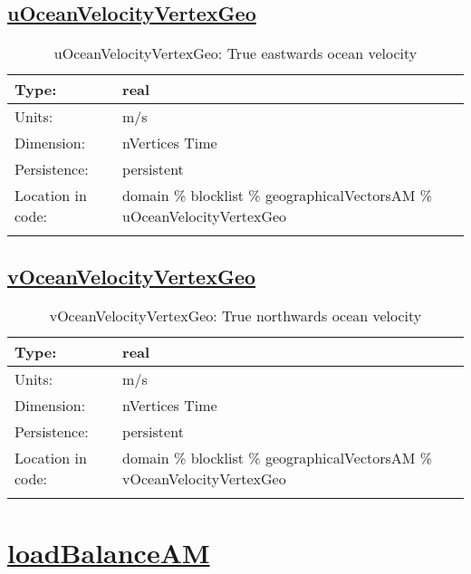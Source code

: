 \subsection[uOceanVelocityVertexGeo]{\hyperref[sec:var_tab_geographicalVectorsAM]{uOceanVelocityVertexGeo}}
\label{subsec:var_sec_geographicalVectorsAM_uOceanVelocityVertexGeo}
\begin{center}
\begin{longtable}{| p{2.0in} | p{4.0in} |}
        \hline 
        Type: & real \\
        \hline 
        Units: & \si{m/s} \\
        \hline 
        Dimension: & nVertices Time \\
        \hline 
        Persistence: & persistent \\
        \hline 
         Location in code: & domain \% blocklist \% geographicalVectorsAM \% uOceanVelocityVertexGeo \\
         \hline 
    \caption{uOceanVelocityVertexGeo: True eastwards ocean velocity}
\end{longtable}
\end{center}
\subsection[vOceanVelocityVertexGeo]{\hyperref[sec:var_tab_geographicalVectorsAM]{vOceanVelocityVertexGeo}}
\label{subsec:var_sec_geographicalVectorsAM_vOceanVelocityVertexGeo}
\begin{center}
\begin{longtable}{| p{2.0in} | p{4.0in} |}
        \hline 
        Type: & real \\
        \hline 
        Units: & \si{m/s} \\
        \hline 
        Dimension: & nVertices Time \\
        \hline 
        Persistence: & persistent \\
        \hline 
         Location in code: & domain \% blocklist \% geographicalVectorsAM \% vOceanVelocityVertexGeo \\
         \hline 
    \caption{vOceanVelocityVertexGeo: True northwards ocean velocity}
\end{longtable}
\end{center}
\section[loadBalanceAM]{\hyperref[sec:var_tab_loadBalanceAM]{loadBalanceAM}}
\label{sec:var_sec_loadBalanceAM}
